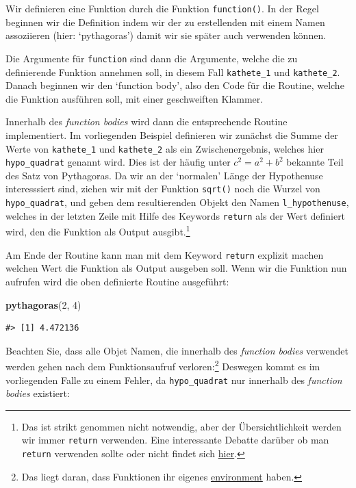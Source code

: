 \documentclass[]{tufte-book}
\newenvironment{Shaded}{}{}
\newcommand{\KeywordTok}[1]{\textcolor[rgb]{0.00,0.44,0.13}{\textbf{#1}}}
\newcommand{\DecValTok}[1]{\textcolor[rgb]{0.25,0.63,0.44}{#1}}
\newcommand{\NormalTok}[1]{#1}
\begin{document}
Wir definieren eine Funktion durch die Funktion \texttt{function()}. In
der Regel beginnen wir die Definition indem wir der zu erstellenden mit
einem Namen assoziieren (hier: `pythagoras') damit wir sie später auch
verwenden können.

Die Argumente für \texttt{function} sind dann die Argumente, welche die
zu definierende Funktion annehmen soll, in diesem Fall
\texttt{kathete\_1} und \texttt{kathete\_2}. Danach beginnen wir den
`function body', also den Code für die Routine, welche die Funktion
ausführen soll, mit einer geschweiften Klammer.

Innerhalb des \emph{function bodies} wird dann die entsprechende Routine
implementiert. Im vorliegenden Beispiel definieren wir zunächst die
Summe der Werte von \texttt{kathete\_1} und \texttt{kathete\_2} als ein
Zwischenergebnis, welches hier \texttt{hypo\_quadrat} genannt wird. Dies
ist der häufig unter \(c^2=a^2 + b^2\) bekannte Teil des Satz von
Pythagoras. Da wir an der `normalen' Länge der Hypothenuse interesssiert
sind, ziehen wir mit der Funktion \texttt{sqrt()} noch die Wurzel von
\texttt{hypo\_quadrat}, und geben dem resultierenden Objekt den Namen
\texttt{l\_hypothenuse}, welches in der letzten Zeile mit Hilfe des
Keywords \texttt{return} als der Wert definiert wird, den die Funktion
als Output ausgibt.\footnote{Das ist strikt genommen nicht notwendig,
  aber der Übersichtlichkeit werden wir immer \texttt{return} verwenden.
  Eine interessante Debatte darüber ob man \texttt{return} verwenden
  sollte oder nicht findet sich
  \href{https://stackoverflow.com/questions/11738823/explicitly-calling-return-in-a-function-or-not}{hier}.}

Am Ende der Routine kann man mit dem Keyword \texttt{return} explizit
machen welchen Wert die Funktion als Output ausgeben soll. Wenn wir die
Funktion nun aufrufen wird die oben definierte Routine ausgeführt:

\begin{Shaded}
\begin{Highlighting}[]
\KeywordTok{pythagoras}\NormalTok{(}\DecValTok{2}\NormalTok{, }\DecValTok{4}\NormalTok{)}
\end{Highlighting}
\end{Shaded}

\begin{verbatim}
#> [1] 4.472136
\end{verbatim}

Beachten Sie, dass alle Objet Namen, die innerhalb des \emph{function
bodies} verwendet werden gehen nach dem Funktionsaufruf
verloren:\footnote{Das liegt daran, dass Funktionen ihr eigenes
  \href{https://adv-r.hadley.nz/environments.html}{environment} haben.}
Deswegen kommt es im vorliegenden Falle zu einem Fehler, da
\texttt{hypo\_quadrat} nur innerhalb des \emph{function bodies}
existiert:
\end{document}
